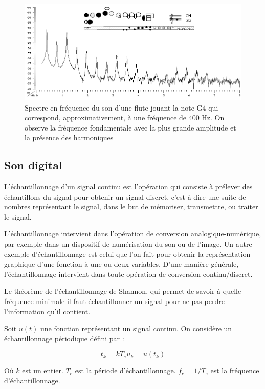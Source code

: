 \documentclass[conference,onecolumn]{IEEEtran}
\begin{document}
 \begin{figure}[H]
 \centering
    \includegraphics[scale=0.5]{img4.png}
    \caption{Spectre en fréquence du son d'une flute jouant la note G4 qui correspond, approximativement, à une fréquence de 400 Hz. On observe la fréquence fondamentale avec la plus grande amplitude et la présence des harmoniques}
\end{figure}

\subsection{Son digital}

L'échantillonnage d'un signal continu est l'opération qui consiste à prélever des échantillons du signal pour obtenir un signal discret, c'est-à-dire une suite de nombres représentant le signal, dans le but de mémoriser, transmettre, ou traiter le signal. 

L'échantillonnage intervient dans l'opération de conversion analogique-numérique, par exemple dans un dispositif de numérisation du son ou de l'image. Un autre exemple d'échantillonnage est celui que l'on fait pour obtenir la représentation graphique d'une fonction à une ou deux variables. D'une manière générale, l'échantillonnage intervient dans toute opération de conversion continu/discret. 

Le théorème de l'échantillonnage de Shannon, qui permet de savoir à quelle fréquence minimale il faut échantillonner un signal pour ne pas perdre l'information qu'il contient. 

Soit $u(t)$ une fonction représentant un signal continu. On considère un échantillonnage périodique défini par : 

\begin{equation}
    t_k = kT_e
    u_k = u(t_k)
\end{equation}

Où $k$ est un entier. $T_e$ est la période d'échantillonnage. $f_e=1/T_e$ est la fréquence d'échantillonnage. 
\end{document}

